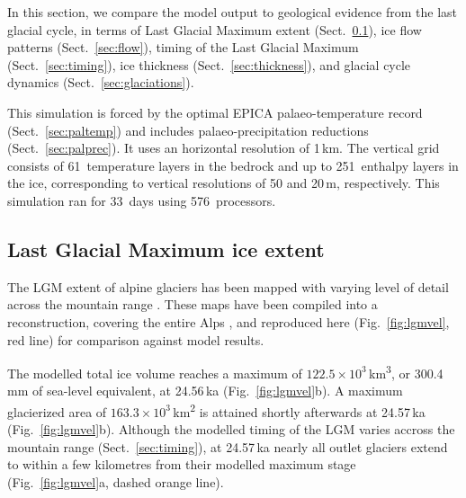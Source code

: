\documentclass[tc, manuscript]{copernicus}
\begin{document}
    In this section, we compare the model output to geological evidence from
    the last glacial cycle, in terms of Last Glacial Maximum extent
    (Sect.~\ref{sec:extent}), ice flow patterns
    (Sect.~\ref{sec:flow}), timing of the Last Glacial Maximum
    (Sect.~\ref{sec:timing}), ice thickness (Sect.~\ref{sec:thickness}), and
    glacial cycle dynamics (Sect.~\ref{sec:glaciations}).

    This simulation is forced by the optimal EPICA palaeo-temperature record
    (Sect.~\ref{sec:paltemp}) and includes palaeo-precipitation reductions
    (Sect.~\ref{sec:palprec}). It uses an horizontal resolution of 1\,km. The
    vertical grid consists of 61~temperature layers in the bedrock and up to
    251~enthalpy layers in the ice, corresponding to vertical resolutions of 50
    and 20\,\unit{m}, respectively. This simulation ran for 33~days using
    576~processors.


\subsection{Last Glacial Maximum ice extent}
\label{sec:extent}

    The LGM extent of alpine glaciers has been mapped with varying level of
    detail across the mountain range \citep{Penck.Bruckner.1909, Jackli.1962,
    Husen.1987, Bini.etal.2009, Coutterand.2010, Bavec.Verbic.2011,
    Buoncristiani.Campy.2011, Husen.2011}. These maps have been compiled
    into a reconstruction, covering the entire Alps \citep{Ehlers.etal.2011},
    and reproduced here (Fig.~\ref{fig:lgmvel}, red line) for comparison
    against model results.

    The modelled total ice volume reaches a maximum of $122.5 \times
    10^{3}$\,\unit{km^3}, or 300.4\,mm of sea-level equivalent, at 24.56\,ka
    (Fig.~\ref{fig:lgmvel}b). A maximum glacierized area of $163.3 \times
    10^{3}$\,\unit{km^2} is attained shortly afterwards at 24.57\,ka
    (Fig.~\ref{fig:lgmvel}b). Although the modelled timing of the LGM varies
    accross the mountain range (Sect.~\ref{sec:timing}), at 24.57\,ka nearly
    all outlet glaciers extend to within a few kilometres from their modelled
    maximum stage (Fig.~\ref{fig:lgmvel}a, dashed orange line).
\end{document}

